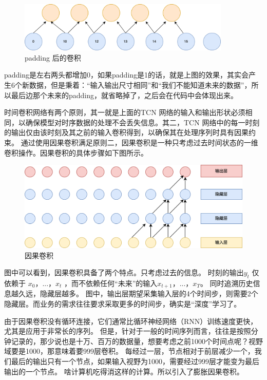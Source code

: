 \begin{figure}[htbp]
  \centering
  \includegraphics[width=0.9\textwidth]{figures/convolution_2.png}
  \caption{padding 后的卷积}
\end{figure}

padding是左右两头都增加0，如果padding是1的话，就是上图的效果，其实会产生6个新数据，但是秉着：“输入输出尺寸相同”和“我们不能知道未来的数据”，所以最后边那个未来的padding，就省略掉了，之后会在代码中会体现出来。

时间卷积网络有两个原则，其一就是上面的TCN 网络的输入和输出形状必须相同，以确保模型对时序数据的处理不会丢失信息。其二，TCN 网络中的每一时刻的输出仅由该时刻及其之前的输入卷积得到，以确保其在处理序列时具有因果约束。
通过使用因果卷积满足原则二，因果卷积是一种只考虑过去时间状态的一维卷积操作。因果卷积的具体步骤如下图所示。

\begin{figure}[htbp]
  \centering
  \includegraphics[width=\textwidth]{figures/causal_convolution.png}
  \caption{因果卷积}
\end{figure}

图中可以看到，因果卷积具备了两个特点。只考虑过去的信息。 时刻的输出$y_t$ 仅依赖于 $x_0，...，x_t$ ，而不依赖任何“未来”的输入$x_{t+1}，...，x_T$。
同时追溯历史信息越久远，隐藏层越多。 图中，输出层期望采集输入层的4个时间步，则需要2个隐藏层。而业务的需求往往要求采取更多的时间步，确实是“深度”学习了。

由于因果卷积没有循环连接，它们通常比循环神经网络（RNN）训练速度更快，尤其是应用于非常长的序列。
但是，针对于一般的时间序列而言，往往是按照分钟记录的，那少说也是十万、百万的数据量，想要考虑之前1000个时间点呢？视野域要是1000，那意味着要999层卷积。
每经过一层，节点相对于前层减少一个，我们最后的输出只有一个节点，如果输入视野为1000，需要经过999层才能变为最后输出的一个节点。
啥计算机吃得消这样的计算。所以引入了膨胀因果卷积。



